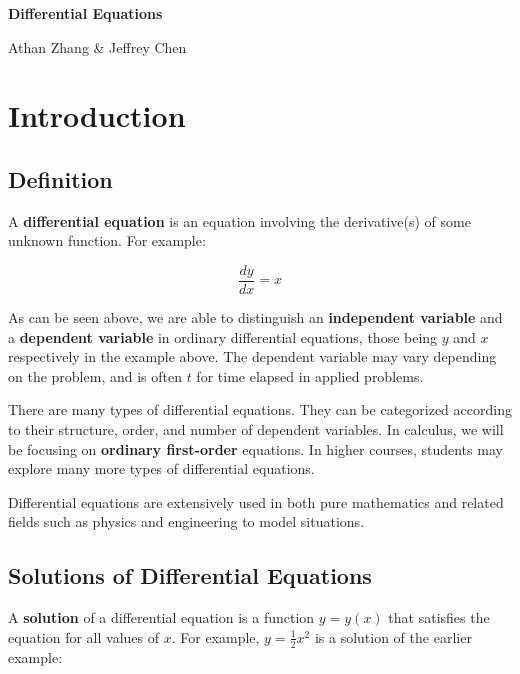 \documentclass[11pt]{article}
\begin{document}
\textbf{\Huge Differential Equations}

Athan Zhang \& Jeffrey Chen





\section{Introduction}

\subsection{Definition}

A \textbf{differential equation} is an equation involving the derivative(s) of some unknown function. For example:

\[ \frac{dy}{dx} = x \]

As can be seen above, we are able to distinguish an \textbf{independent variable} and a \textbf{dependent variable} in ordinary differential equations, those being $y$ and $x$ respectively in the example above. The dependent variable may vary depending on the problem, and is often $t$ for time elapsed in applied problems.

There are many types of differential equations. They can be categorized according to their structure, order, and number of dependent variables. In calculus, we will be focusing on \textbf{ordinary first-order} equations. In higher courses, students may explore many more types of differential equations.

Differential equations are extensively used in both pure mathematics and related fields such as physics and engineering to model situations. 

\subsection{Solutions of Differential Equations}
A \textbf{solution} of a differential equation is a function $y = y(x)$ that satisfies the equation for all values of $x$. For example, $y=\frac{1}{2}x^2$ is a solution of the earlier example:
\end{document}
